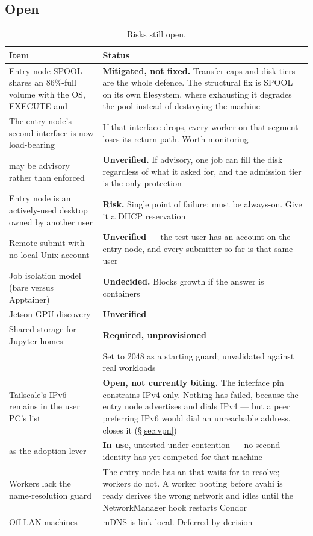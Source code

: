 \subsection{Open}

\begin{table}[H]
\centering
\begin{tabularx}{\textwidth}{L{0.36\textwidth} Y}
\toprule
\textbf{Item} & \textbf{Status} \\
\midrule
Entry node SPOOL shares an 86\%-full volume with the OS, EXECUTE and  & \textbf{Mitigated, not fixed.} Transfer caps and disk tiers are the whole defence. The structural fix is SPOOL on its own filesystem, where exhausting it degrades the pool instead of destroying the machine \\
The entry node's second interface is now load-bearing & If that interface drops, every worker on that segment loses its return path. Worth monitoring \\
 may be advisory rather than enforced & \textbf{Unverified.} If advisory, one job can fill the disk regardless of what it asked for, and the admission tier is the only protection \\
Entry node is an actively-used desktop owned by another user & \textbf{Risk.} Single point of failure; must be always-on. Give it a DHCP reservation \\
Remote submit with no local Unix account & \textbf{Unverified} --- the test user has an account on the entry node, and every submitter so far is that same user \\
Job isolation model (bare versus Apptainer) & \textbf{Undecided.} Blocks growth if the answer is containers \\
Jetson GPU discovery & \textbf{Unverified} \\
Shared storage for Jupyter homes & \textbf{Required, unprovisioned} \\
 & Set to 2048 as a starting guard; unvalidated against real workloads \\
Tailscale's IPv6 remains in the user PC's  list & \textbf{Open, not currently biting.} The interface pin constrains IPv4 only. Nothing has failed, because the entry node advertises and dials IPv4 --- but a peer preferring IPv6 would dial an unreachable address.  closes it (\S\ref{sec:vpn}) \\
 as the adoption lever & \textbf{In use}, untested under contention --- no second identity has yet competed for that machine \\
Workers lack the name-resolution guard & The entry node has an  that waits for  to resolve; workers do not. A worker booting before avahi is ready derives the wrong network and idles until the NetworkManager hook restarts Condor \\
Off-LAN machines & mDNS is link-local. Deferred by decision \\
\bottomrule
\end{tabularx}
\caption{Risks still open.}
\end{table}

